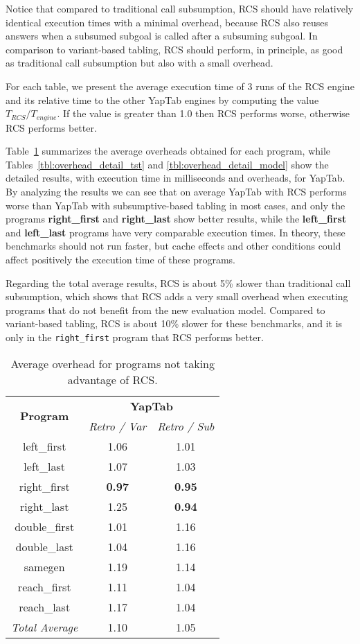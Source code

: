Notice that compared to traditional call subsumption, RCS should have
relatively identical execution times with a minimal overhead, because RCS also reuses answers when a subsumed subgoal is
called after a subsuming subgoal. In comparison to variant-based tabling, RCS should perform, in principle,
as good as traditional call subsumption but also with a small overhead.

For each table, we present the average execution time of 3 runs of the RCS engine and its relative time
to the other YapTab engines by computing the value $T_{RCS} / T_{engine}$.
If the value is greater than 1.0 then RCS performs worse, otherwise RCS performs better.

Table~\ref{tbl:overhead_overview} summarizes the average overheads obtained for each program,
while Tables~\ref{tbl:overhead_detail_tst} and \ref{tbl:overhead_detail_model} show the detailed
results, with execution time in milliseconds and overheads, for YapTab.
By analyzing the results we can see that on average YapTab with RCS performs worse
than YapTab with subsumptive-based tabling in most cases, and only the
programs \textbf{right\_first} and \textbf{right\_last} show better results,
while the \textbf{left\_first} and \textbf{left\_last} programs have very comparable execution times.
In theory, these benchmarks should not run faster, but cache effects and other
conditions could affect positively the execution time of these programs.

Regarding the total average results, RCS is about 5\% slower than traditional call subsumption,
which shows that RCS adds a very small overhead when executing programs that do not benefit from the
new evaluation model. Compared to variant-based tabling, RCS is about 10\% slower for these benchmarks,
and it is only in the \texttt{right\_first} program that RCS performs better.

\begin{table}[ht]
\centering
  \begin{tabular}{ccc}
   \hline
    \hline
    \multirow{2}{*}{\textbf{Program}} & \multicolumn{2}{c}{\textbf{YapTab}} \\
    & \textit{\small{Retro / Var}} & \textit{\small{Retro / Sub}} \\
   \hline
   \hline
   left\_first & 1.06 & 1.01 \\
   left\_last &  1.07  & 1.03 \\
   right\_first & \textbf{0.97} & \textbf{0.95} \\
   right\_last & 1.25 & \textbf{0.94} \\
   double\_first & 1.01 & 1.16 \\
   double\_last & 1.04 & 1.16 \\
   samegen & 1.19 & 1.14 \\
   reach\_first  &  1.11  & 1.04 \\
   reach\_last  &  1.17  & 1.04 \\
\hline
\hline
\textit{Total Average} &  1.10 &  1.05 \\
\hline
\hline
\end{tabular}
\caption{Average overhead for programs not taking advantage of RCS.}
\label{tbl:overhead_overview}
\end{table}

